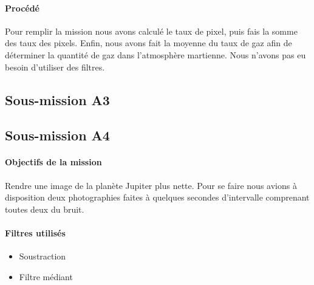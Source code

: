 \documentclass[12pt]{article}
\begin{document}
	\paragraph{Procédé}	
		Pour remplir la mission nous avons calculé le taux de pixel, puis fais la somme des taux des pixels. Enfin, nous avons fait la moyenne du taux de gaz afin de déterminer la quantité de gaz dans l'atmosphère martienne. Nous n'avons pas eu besoin d'utiliser des filtres.

\newpage

	\subsection{Sous-mission A3}
	\subsection{Sous-mission A4}

	\begin{vwcol}[widths={0.8,0.2}, rule=0pt]
	\begin{minipage}{0.7\textwidth}
	\paragraph{Objectifs de la mission}

	Rendre une image de la planète Jupiter plus nette. Pour se faire nous avions à disposition deux photographies faites à quelques secondes d'intervalle comprenant toutes deux du bruit.
	\end{minipage}
	\begin{minipage}{0.2\textwidth}
	\paragraph{Filtres utilisés}

	\begin{itemize}
		\item Soustraction
		\item Filtre médiant
	\end{itemize}
	\end{minipage}
	\end{vwcol} 
\end{document}
